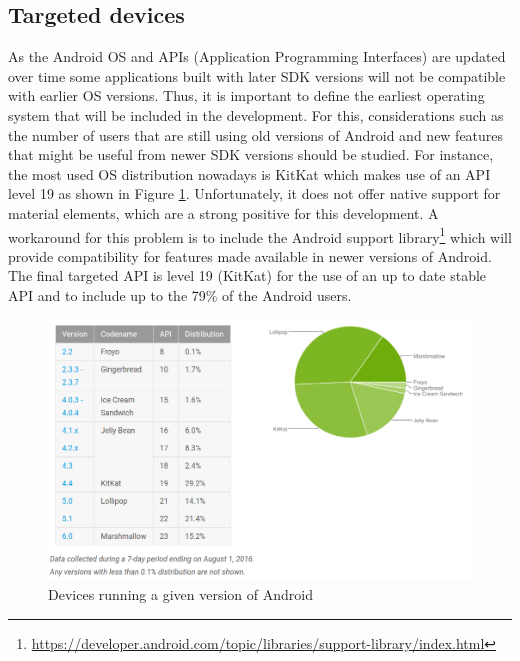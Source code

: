 \subsection{Targeted devices}
As the Android OS and APIs (Application Programming Interfaces) are updated over time some applications built with later SDK versions will not be compatible with earlier OS versions. Thus, it is important to define the earliest operating system that will be included in the development. For this, considerations such as the number of users that are still using old versions of Android and new features that might be useful from newer SDK versions should be studied. For instance, the most used OS distribution nowadays is KitKat which makes use of an API level 19 as shown in Figure \ref{fig:android_platform_versions}.  Unfortunately, it does not offer native support for material elements, which are a strong positive for this development. A workaround for this problem is to include the Android support library\footnote{\url{https://developer.android.com/topic/libraries/support-library/index.html}} which will provide compatibility for features made available in newer versions of Android. The final targeted API is level 19 (KitKat) for the use of an up to date stable API and to include up to the 79\% of the Android users.  

\begin{figure}[H]
\begin{adjustbox}{width=1\textwidth,center=\textwidth}
  \centering
  \includegraphics[scale=1]{images/android_platform_versions.png}
\end{adjustbox}
  \caption[Devices running a given version of Android]{Devices running a given version of Android \footnotemark}
  \label{fig:android_platform_versions}
\end{figure}

